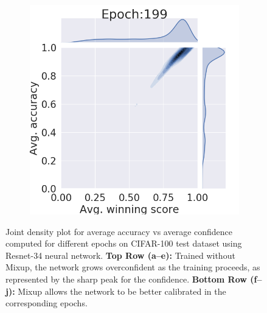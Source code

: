 \documentclass{article}
\begin{document}
\begin{figure}[htb]
\begin{subfigure}[b]{0.19\textwidth}
         \caption{}
     \end{subfigure}
     \hfill
     \begin{subfigure}[b]{0.19\textwidth}
         \centering
         \noindent\includegraphics[width=\textwidth]{images/joint_plot/mixup/199.png}
         \caption{}
     \end{subfigure}
        \caption{Joint density plot for average accuracy vs average confidence computed for different epochs on CIFAR-100 test dataset using Resnet-34 neural network. \textbf{Top Row (a--e):} Trained without Mixup, the network grows overconfident as the training proceeds, as represented by the sharp peak for the confidence. \textbf{Bottom Row (f--j):} Mixup allows the network to be better calibrated in the corresponding epochs.}
        \label{fig:hypothesis}
\end{figure}
\end{document}
